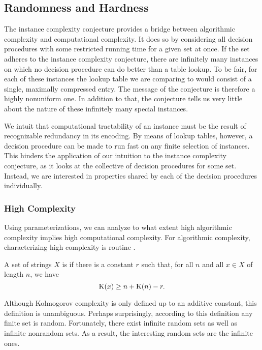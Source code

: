 \subsection{Randomness and Hardness}
The instance complexity conjecture provides a bridge between algorithmic complexity and computational complexity.
It does so by considering all decision procedures with some restricted running time for a given set at once.
If the set adheres to the instance complexity conjecture, there are infinitely many instances on which no decision procedure can do better than a table lookup.
To be fair, for each of these instances the lookup table we are comparing to would consist of a single, maximally compressed entry.
The message of the conjecture is therefore a highly nonuniform one.
In addition to that, the conjecture tells us very little about the nature of these infinitely many special instances.

We intuit that computational tractability of an instance must be the result of recognizable redundancy in its encoding.
By means of lookup tables, however, a decision procedure can be made to run fast on any finite selection of instances.
This hinders the application of our intuition to the instance complexity conjecture, as it looks at the collective of decision procedures for some set.
Instead, we are interested in properties shared by each of the decision procedures individually.

\subsubsection{High Complexity}
Using parameterizations, we can analyze to what extent high algorithmic complexity implies high computational complexity.
For algorithmic complexity, characterizing high complexity is routine \parencite{li2008introduction}.
\begin{definition}
\label{def:random}
  A set of strings $X$ is  if there is a constant $r$ such that, for all $n$ and all $x \in X$ of length $n$, we have
  \begin{equation*}
    \operatorname{K}(x) \ge n + \operatorname{K}(n) - r.
  \end{equation*}
\end{definition}

Although Kolmogorov complexity is only defined up to an additive constant, this definition is unambiguous.
Perhaps surprisingly, according to this definition any finite set is random.
Fortunately, there exist infinite random sets as well as infinite nonrandom sets.
As a result, the interesting random sets are the infinite ones.


